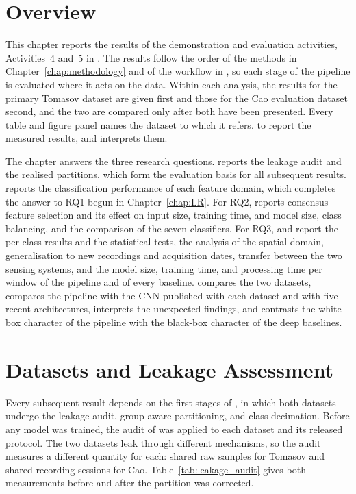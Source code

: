\section{Overview}%
\label{sec:chap4Overview}
This chapter reports the results of the demonstration and evaluation activities, Activities~4 and~5 in . The results follow the order of the methods in Chapter~\ref{chap:methodology} and of the workflow in , so each stage of the pipeline is evaluated where it acts on the data. Within each analysis, the results for the primary Tomasov dataset are given first and those for the Cao evaluation dataset second, and the two are compared only after both have been presented. Every table and figure panel names the dataset to which it refers.  to  report the measured results, and  interprets them.

The chapter answers the three research questions.  reports the leakage audit and the realised partitions, which form the evaluation basis for all subsequent results.  reports the classification performance of each feature domain, which completes the answer to RQ1 begun in Chapter~\ref{chap:LR}. For RQ2,  reports consensus feature selection and its effect on input size, training time, and model size,  class balancing, and  the comparison of the seven classifiers. For RQ3,  and  report the per-class results and the statistical tests,  the analysis of the spatial domain,  generalisation to new recordings and acquisition dates,  transfer between the two sensing systems, and  the model size, training time, and processing time per window of the pipeline and of every baseline.  compares the two datasets, compares the pipeline with the CNN published with each dataset and with five recent architectures, interprets the unexpected findings, and contrasts the white-box character of the pipeline with the black-box character of the deep baselines.

\section{Datasets and Leakage Assessment}
\label{sec:resLeakage}
Every subsequent result depends on the first stages of , in which both datasets undergo the leakage audit, group-aware partitioning, and class decimation. Before any model was trained, the audit of  was applied to each dataset and its released protocol. The two datasets leak through different mechanisms, so the audit measures a different quantity for each: shared raw samples for Tomasov and shared recording sessions for Cao. Table~\ref{tab:leakage_audit} gives both measurements before and after the partition was corrected.

